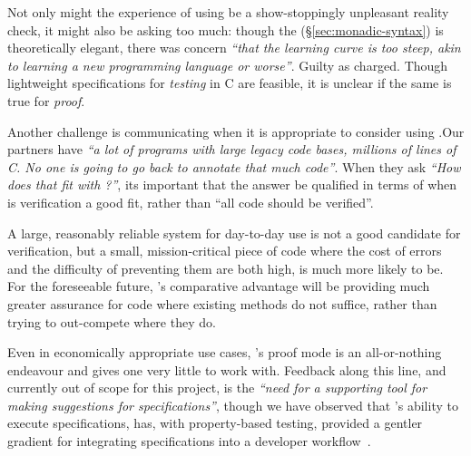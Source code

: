 Not only might the experience of using  be a show-stoppingly unpleasant
reality check, it might also be asking too much: though the 
(\S\ref{sec:monadic-syntax}) is theoretically elegant, there was
concern \emph{``that the learning curve is too steep, \eg{} akin to learning a
new programming language or worse''}. Guilty as charged. Though lightweight
specifications for \emph{testing} in C are feasible, it is unclear if the
same is true for \emph{proof}.


Another challenge is communicating when it is appropriate to consider using
.\@ Our partners have \emph{``a lot of programs with large legacy code bases,
\eg{} millions of lines of C.  No one is going to go back to annotate that
much code''}. When they ask \emph{``How does that fit with ?''}, its
important that the answer be qualified in terms of when is verification a good
fit, rather than ``all code should be verified''.

A large, reasonably reliable system for day-to-day use is not a good candidate
for verification, but a small, mission-critical piece of code where the cost of
errors and the difficulty of preventing them are both high, is much more likely
to be. For the foreseeable future, 's comparative advantage will be providing
much greater assurance for code where existing methods do not suffice, rather
than trying to out-compete where they do.

Even in economically appropriate use cases, 's proof mode is an
all-or-nothing endeavour and gives one very little to work with. Feedback along
this line, and currently out of scope for this project, is the \emph{``need for
a supporting tool for making suggestions for  specifications''}, though we have
observed that 's ability to execute  specifications, has,
with property-based testing, provided a gentler gradient for integrating
specifications into a developer workflow~.

